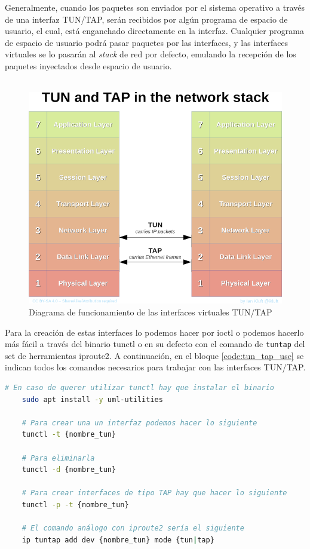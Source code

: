 Generalmente, cuando los paquetes son enviados por el sistema operativo a través de una interfaz TUN/TAP,  serán recibidos por algún programa de espacio de usuario, el cual, está enganchado directamente en la interfaz. Cualquier programa de espacio de usuario podrá pasar paquetes por las interfaces, y las interfaces virtuales se lo pasarán al \textit{stack} de red por defecto, emulando la recepción de los paquetes inyectados desde espacio de usuario.\\
\\
\begin{figure}[ht]
    \centering
    \includegraphics[width=\textwidth]{archivos/img/teoria/linux1.png}
    \caption{Diagrama de funcionamiento de las interfaces virtuales TUN/TAP \cite{tuntap2}}
    \label{fig:linux1}
\end{figure}

Para la creación de estas interfaces lo podemos hacer por ioctl o podemos hacerlo más fácil a través del binario tunctl o en su defecto con el comando de \texttt{tuntap} del set de herramientas iproute2. A continuación, en el bloque \ref{code:tun_tap_use} se indican todos los comandos necesarios para trabajar con las interfaces TUN/TAP.\\

\begin{lstlisting}[language= bash, style=Consola, caption={Manejo de interfaces TUN - TAP},label=code:tun_tap_use]
    # En caso de querer utilizar tunctl hay que instalar el binario
    sudo apt install -y uml-utilities
    
    # Para crear una un interfaz podemos hacer lo siguiente
    tunctl -t {nombre_tun}

    # Para eliminarla
    tunctl -d {nombre_tun}

    # Para crear interfaces de tipo TAP hay que hacer lo siguiente
    tunctl -p -t {nombre_tun}
    
    # El comando análogo con iproute2 sería el siguiente
    ip tuntap add dev {nombre_tun} mode {tun|tap}
\end{lstlisting}
\vspace{0.5cm}

